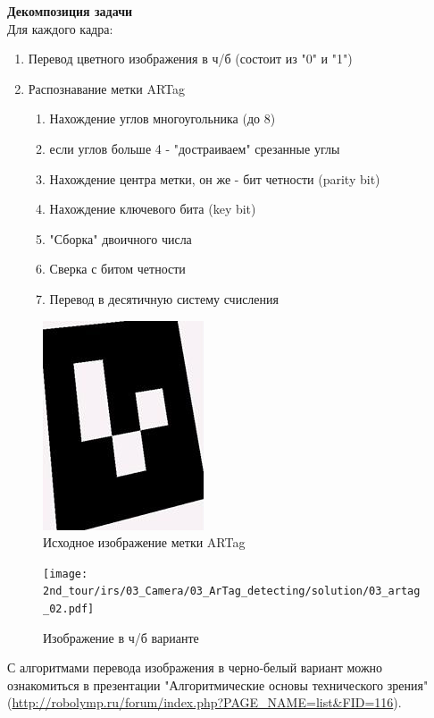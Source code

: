 \solutionSection

\textbf{Декомпозиция задачи} \\
Для каждого кадра:
\begin{enumerate}
	\item Перевод цветного изображения в ч/б (состоит из "0" и "1")
	\item Распознавание метки ARTag
	\begin{enumerate}
		\item Нахождение углов многоугольника (до 8)
		\item если углов больше 4 - "достраиваем" срезанные углы
		\item Нахождение центра метки, он же - бит четности (parity bit)
		\item Нахождение ключевого бита (key bit)
		\item "Сборка" двоичного числа
		\item Сверка с битом четности
		\item Перевод в десятичную систему счисления
	\end{enumerate}
\end{enumerate}

\begin{figure}[h]
	\centering
	\includegraphics[width=0.4\linewidth]{2nd_tour/irs/03_Camera/03_ArTag_detecting/solution/03_artag_01.jpg}
	\caption{Исходное изображение метки ARTag}
	\label{fig:03_artag_01}
\end{figure}

\begin{figure}[h]
	\centering
	\texttt{[image: 2nd\_tour/irs/03\_Camera/03\_ArTag\_detecting/solution/03\_artag\_02.pdf]}
	\caption{Изображение в ч/б варианте}
	\label{fig:03_artag_02}
\end{figure}

С алгоритмами перевода изображения в черно-белый вариант можно ознакомиться в презентации "Алгоритмические основы технического зрения" (\url{http://robolymp.ru/forum/index.php?PAGE_NAME=list&FID=116}).

